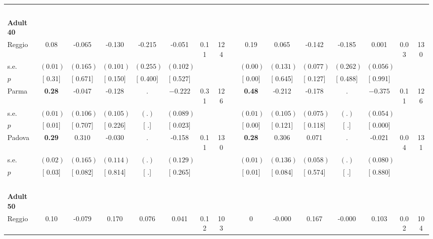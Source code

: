 \begin{longtable}{L{8em} c c c c c c c p{1em} c c c c c c c}
~\\[1em]
\quad \quad \textbf{Adult 40} & & & & & & & & & & & & & & & \\* 
\quad \quad \quad Reggio& 0.08 &    -0.065 &    -0.130 &    -0.215 &    -0.051 &      0.11 &       124 & & 0.19 &     0.065 &    -0.142 &    -0.185 &     0.001 &      0.03 &       130  \\*
\quad \quad \quad \quad s.e.& $ (     0.01)$ & $ (    0.165)$ & $ (    0.101)$ & $ (    0.255)$ & $ (    0.102)$ & & & & $ (     0.00)$ & $ (    0.131)$ & $ (    0.077)$ & $ (    0.262)$ & $ (    0.056)$ & &  \\*
\quad \quad \quad \quad $ p$ & [     0.31] & [    0.671] & [    0.150] & [    0.400] & [    0.527] & & & & [     0.00] & [    0.645] & [    0.127] & [    0.488] & [    0.991] & &  \\[1em]
\quad \quad \quad Parma& \textbf{     0.28} &    -0.047 &    -0.128 &         . & $ \mathbf{   -0.222}$ &      0.31 &       126 & & \textbf{     0.48} &    -0.212 &    -0.178 &         . & $ \mathbf{   -0.375}$ &      0.11 &       126  \\*
\quad \quad \quad \quad s.e.& $ (     0.01)$ & $ (    0.106)$ & $ (    0.105)$ & $ (        .)$ & $ (    0.089)$ & & & & $ (     0.01)$ & $ (    0.105)$ & $ (    0.075)$ & $ (        .)$ & $ (    0.054)$ & &  \\*
\quad \quad \quad \quad $ p$ & [     0.01] & [    0.707] & [    0.226] & [        .] & [    0.023] & & & & [     0.00] & [    0.121] & [    0.118] & [        .] & [    0.000] & &  \\[1em]
\quad \quad \quad Padova& \textbf{     0.29} & $ \mathbf{    0.310}$ &    -0.030 &         . &    -0.158 &      0.11 &       130 & & \textbf{     0.28} & $ \mathbf{    0.306}$ &     0.071 &         . &    -0.021 &      0.04 &       131  \\*
\quad \quad \quad \quad s.e.& $ (     0.02)$ & $ (    0.165)$ & $ (    0.114)$ & $ (        .)$ & $ (    0.129)$ & & & & $ (     0.01)$ & $ (    0.136)$ & $ (    0.058)$ & $ (        .)$ & $ (    0.080)$ & &  \\*
\quad \quad \quad \quad $ p$ & [     0.03] & [    0.082] & [    0.814] & [        .] & [    0.265] & & & & [     0.01] & [    0.084] & [    0.574] & [        .] & [    0.880] & &  \\[1em]
~\\[1em]
\quad \quad \textbf{Adult 50} & & & & & & & & & & & & & & & \\* 
\quad \quad \quad Reggio& 0.10 &    -0.079 &     0.170 &     0.076 &     0.041 &      0.12 &       103 & & 0 &    -0.000 &     0.167 &    -0.000 &     0.103 &      0.02 &       104  \\*

\end{longtable}
